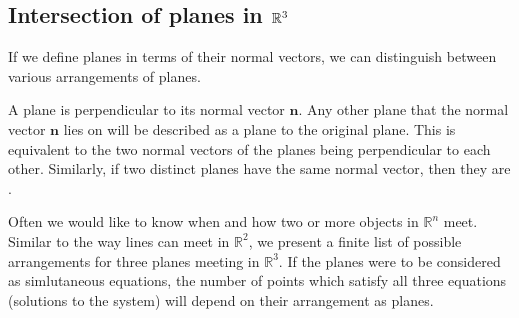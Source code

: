 \documentclass[letterpaper,10pt,english]{jupyterBook}
\begin{document}
\subsection{Intersection of planes in \protect\(\mathbb{R}^3\protect\)}
\label{\detokenize{_pages/4.2_Planes:intersection-of-planes-in-mathbb-r-3}}\label{\detokenize{_pages/4.2_Planes:index-3}}\label{\detokenize{_pages/4.2_Planes:intersection-of-planes-section}}
\sphinxAtStartPar
If we define planes in terms of their normal vectors, we can distinguish between various arrangements of planes.

\sphinxAtStartPar
A plane is perpendicular to its normal vector \(\mathbf{n}\). Any other plane that the normal vector \(\mathbf{n}\) lies on will be described as a plane  to the original plane. This is equivalent to the two normal vectors of the planes being perpendicular to each other. Similarly, if two distinct planes have the same normal vector, then they are .

\sphinxAtStartPar
Often we would like to know when and how two or more objects in \(\mathbb{R}^n\) meet. Similar to the way lines can meet in \(\mathbb{R}^2\), we present a finite list of possible arrangements for three planes meeting in \(\mathbb{R}^3\). If the planes were to be considered as simlutaneous equations, the number of points which satisfy all three equations (solutions to the system) will depend on their arrangement as planes.
\end{document}
